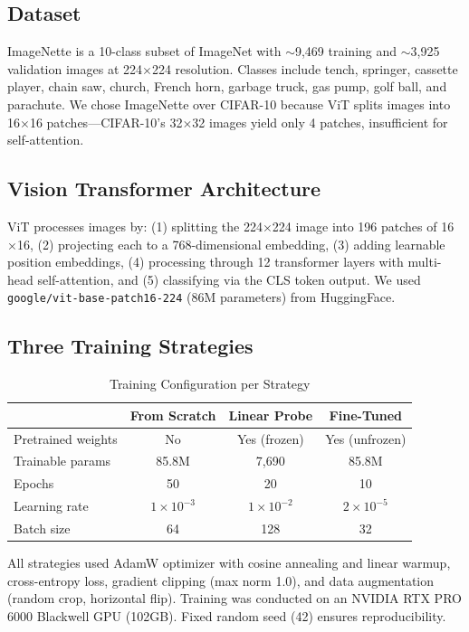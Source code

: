 \documentclass[12pt]{article}
\begin{document}
\subsection{Dataset}

ImageNette is a 10-class subset of ImageNet with $\sim$9,469 training and $\sim$3,925 validation images at 224$\times$224 resolution. Classes include tench, springer, cassette player, chain saw, church, French horn, garbage truck, gas pump, golf ball, and parachute. We chose ImageNette over CIFAR-10 because ViT splits images into 16$\times$16 patches---CIFAR-10's 32$\times$32 images yield only 4 patches, insufficient for self-attention.

\subsection{Vision Transformer Architecture}

ViT processes images by: (1) splitting the 224$\times$224 image into 196 patches of 16$\times$16, (2) projecting each to a 768-dimensional embedding, (3) adding learnable position embeddings, (4) processing through 12 transformer layers with multi-head self-attention, and (5) classifying via the CLS token output. We used \texttt{google/vit-base-patch16-224} (86M parameters) from HuggingFace.

\subsection{Three Training Strategies}

\begin{table}[H]
\centering
\caption{Training Configuration per Strategy}
\begin{tabular}{lccc}
\toprule
& \textbf{From Scratch} & \textbf{Linear Probe} & \textbf{Fine-Tuned} \\
\midrule
Pretrained weights & No & Yes (frozen) & Yes (unfrozen) \\
Trainable params & 85.8M & 7,690 & 85.8M \\
Epochs & 50 & 20 & 10 \\
Learning rate & $1 \times 10^{-3}$ & $1 \times 10^{-2}$ & $2 \times 10^{-5}$ \\
Batch size & 64 & 128 & 32 \\
\bottomrule
\end{tabular}
\end{table}

All strategies used AdamW optimizer with cosine annealing and linear warmup, cross-entropy loss, gradient clipping (max norm 1.0), and data augmentation (random crop, horizontal flip). Training was conducted on an NVIDIA RTX PRO 6000 Blackwell GPU (102GB). Fixed random seed (42) ensures reproducibility.
\end{document}
